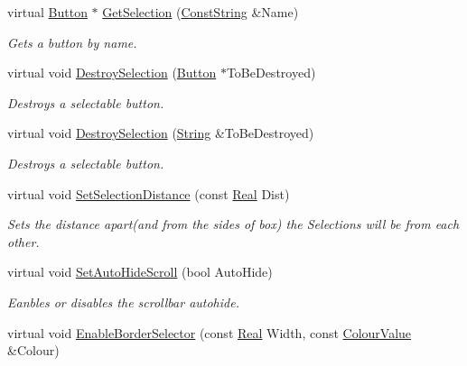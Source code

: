 \begin{DoxyCompactItemize}
virtual \hyperlink{classphys_1_1UI_1_1Button}{Button} $\ast$ \hyperlink{classphys_1_1UI_1_1ButtonListBox_a88796d75b2677b0a8e5d70fcf3677348}{GetSelection} (\hyperlink{namespacephys_a5ce5049f8b4bf88d6413c47b504ebb31}{ConstString} \&Name)
\begin{DoxyCompactList}\small\item\em Gets a button by name. \item\end{DoxyCompactList}\item 
virtual void \hyperlink{classphys_1_1UI_1_1ButtonListBox_a4ac91d2219d9fa471976bd482dc909b4}{DestroySelection} (\hyperlink{classphys_1_1UI_1_1Button}{Button} $\ast$ToBeDestroyed)
\begin{DoxyCompactList}\small\item\em Destroys a selectable button. \item\end{DoxyCompactList}\item 
virtual void \hyperlink{classphys_1_1UI_1_1ButtonListBox_a2717ab6e1ad39bb7db634a97c4f4157a}{DestroySelection} (\hyperlink{namespacephys_aa03900411993de7fbfec4789bc1d392e}{String} \&ToBeDestroyed)
\begin{DoxyCompactList}\small\item\em Destroys a selectable button. \item\end{DoxyCompactList}\item 
virtual void \hyperlink{classphys_1_1UI_1_1ButtonListBox_a12526e5fc6e8ea6ea22bf59f5a5ff7ff}{SetSelectionDistance} (const \hyperlink{namespacephys_af7eb897198d265b8e868f45240230d5f}{Real} Dist)
\begin{DoxyCompactList}\small\item\em Sets the distance apart(and from the sides of box) the Selections will be from each other. \item\end{DoxyCompactList}\item 
virtual void \hyperlink{classphys_1_1UI_1_1ButtonListBox_ab5caa7d6bd929875bb8ca1278743ff40}{SetAutoHideScroll} (bool AutoHide)
\begin{DoxyCompactList}\small\item\em Eanbles or disables the scrollbar autohide. \item\end{DoxyCompactList}\item 
virtual void \hyperlink{classphys_1_1UI_1_1ButtonListBox_a0ccce74928b4e35ecdf650410ac66d35}{EnableBorderSelector} (const \hyperlink{namespacephys_af7eb897198d265b8e868f45240230d5f}{Real} Width, const \hyperlink{classphys_1_1ColourValue}{ColourValue} \&Colour)

\end{DoxyCompactItemize}
